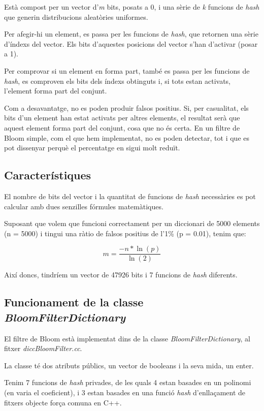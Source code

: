 \documentclass[titlepage]{article}
\begin{document}
Està compost per un vector d'\textit{m} bits, posats a 0, i una sèrie de \textit{k} funcions de \textit{hash} que generin distribucions aleatòries uniformes.

Per afegir-hi un element, es passa per les funcions de \textit{hash}, que retornen una sèrie d'índexs del vector. Els bits d'aquestes posicions del vector s'han d'activar (posar a 1).

Per comprovar si un element en forma part, també es passa per les funcions de \textit{hash}, es comproven els bits dels índexs obtinguts i, si tots estan activats, l'element forma part del conjunt.

Com a desavantatge, no es poden produir falsos positius. Si, per casualitat, els bits d'un element han estat activats per altres elements, el resultat serà que aquest element forma part del conjunt, cosa que no és certa. En un filtre de Bloom simple, com el que hem implementat, no es poden detectar, tot i que es pot dissenyar perquè el percentatge en sigui molt reduït. 

\subsection{Característiques}
El nombre de bits del vector i la quantitat de funcions de \textit{hash} necessàries es pot calcular amb dues senzilles fórmules matemàtiques.

Suposant que volem que funcioni correctament per un diccionari de 5000 elements (n = 5000) i tingui una ràtio de falsos positius de l'1\% (p = 0.01), tenim que:

\[m = \frac{-n * \ln(p)}{\ln(2)}\]

Així doncs, tindríem un vector de 47926 bits i 7 funcions de \textit{hash} diferents.

\subsection{Funcionament de la classe \textit{BloomFilterDictionary}}
El filtre de Bloom està implementat dins de la classe \textit{BloomFilterDictionary}, al fitxer \textit{diccBloomFilter.cc}.

La classe té dos atributs públics, un vector de booleans i la seva mida, un enter.

Tenim 7 funcions de \textit{hash} privades, de les quals 4 estan basades en un polinomi (en varia el coeficient), i 3 estan basades en una funció \textit{hash} d'enllaçament de fitxers objecte força comuna en C++.
\end{document}
